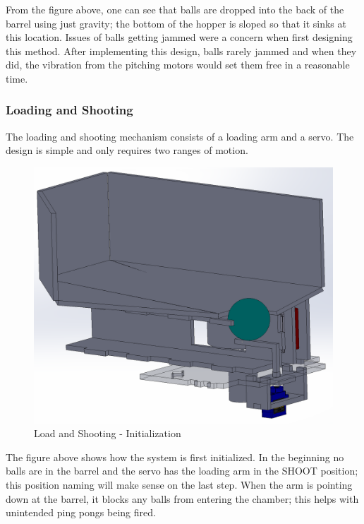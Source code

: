 \documentclass{article}
\begin{document}
From the figure above, one can see that balls are dropped into the back of the barrel using just gravity; the bottom of the hopper is sloped so that it sinks at this location. Issues of balls getting jammed were a concern when first designing this method. After implementing this design, balls rarely jammed and when they did, the vibration from the pitching motors would set them free in a reasonable time.

\subsubsection{Loading and Shooting}

The loading and shooting mechanism consists of a loading arm and a servo. The design is simple and only requires two ranges of motion.

\begin{figure}[H]
    \centering
    \includegraphics[width = 5in]{ShootLoadStep1.PNG}
    \caption{Load and Shooting - Initialization}
    \label{fig:ShootLoadStep1}
\end{figure}

The figure above shows how the system is first initialized. In the beginning no balls are in the barrel and the servo has the loading arm in the SHOOT position; this position naming will make sense on the last step. When the arm is pointing down at the barrel, it blocks any balls from entering the chamber; this helps with unintended ping pongs being fired.
\end{document}
